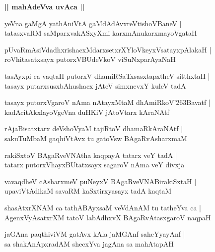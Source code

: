 \documentclass[twoside,12pt,openright]{book}
\def\S{\char'263}
\newcounter{shloka}[chapter]
\def\uvaca#1{\centerline{{\large\textbf{#1}}}}
\begin{document}
\uvaca{|| mahAdeVva uvAca ||}

\begin{shloka}%
yeVna gaMgA yathAniVtA gaMdAdAvxreVtishoVBaneV |\\
tatasxvaRM saMparxvakASxyXmi karxmAnukarxmayoVgataH 
\end{shloka}

\begin{shloka}%
pUvaRmAsiVdadhxrishacxMdarxsetxrXYloVkeyxVsatayxpAlakaH |\\
roVhitasatxsayx putorxVBUdeVkoV viSuNxparAyaNaH 
\end{shloka}

\begin{shloka}%
tasAyxpi ca vaqtaH putorxV dhamiRSaTxsasxtapxtheV sitthxtaH |\\
tasayx putarxsusxbAhushacx jAteV simxnevxY kuleV tadA
\end{shloka}

\begin{shloka}%
tasayx putorxVgaroV nAma nAtayxMtaM dhAmiRkoV\S Bavatf |\\
kadAcitAkxlayoVgeVna duHKiV jAtoVtarx kAraNAtf
\end{shloka}

\begin{shloka}%
rAjaBisatxtarx deVshoVyaM tajiRtoV dhamaRkAraNAtf |\\
sakuTuMbaM gaqhiVtAvx tu gatoVsw BAgaRvAsharxmaM 
\end{shloka}

\begin{shloka}%
rakiSxtoV BAgaRveVNAtha kaqpayA tatarx veY tadA |\\
tatarx putorxVhayxBUtatxsayx sagaroV nAma veY divxja 
\end{shloka}

\begin{shloka}%
vavaqdheV cAsharxmeV puNeyxV BAgaRveVNABirakiSxtaH |\\
upaviVtAdikaM savaRM kaSxtirxyasayx tadA kaqtaM 
\end{shloka}

\begin{shloka}%
shasAtxrXNAM ca tathABAyxsaM veVdAnAM tu tatheYva ca |\\
AgenxVyAsatxrXM tatoV labAdhxvX BAgaRvAtasxgaroV naqpaH
\end{shloka}

\begin{shloka}%
jaGAna paqthiviVM gatAvx kAla jaMGAnf saheYyayAnf |\\
sa shakAnApxradAM shecxYva jagAna sa mahAtapAH 
\end{shloka}
\end{document}
